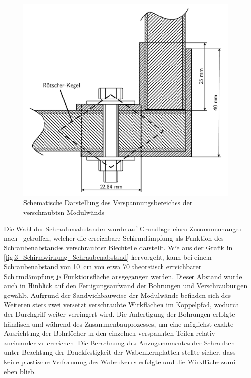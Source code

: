 \begin{figure}[ht]
    \centering
    \includegraphics[page=1, trim=0cm 0cm 0cm 0cm, clip, width = .45\textwidth]{Abbildungen/Kapitel3/Schematik_Verspannungskegel.pdf}
    \caption{Schematische Darstellung des Verspannungsbereiches der verschraubten Modulwände}
    \label{fig:3_Verspannungskegel_L-Profile}
\end{figure}


Die Wahl des Schraubenabstandes wurde auf Grundlage eines Zusammenhanges nach~\cite{Design_of_shielded_enclosures} getroffen, welcher die erreichbare Schirmdämpfung als Funktion des Schraubenabstandes verschraubter Blechteile darstellt. Wie aus der Grafik in \Abb\ref{fig:3_Schirmwirkung_Schraubenabstand} hervorgeht, kann bei einem Schraubenabstand von \SI{10}{\centi\meter} von etwa \SI{70}{\Dezibel} theoretisch erreichbarer Schirmdämpfung je Funktionsfläche ausgegangen werden. Dieser Abstand wurde auch in Hinblick auf den Fertigungsaufwand der Bohrungen und Verschraubungen gewählt. Aufgrund der Sandwichbauweise der Modulwände befinden sich des Weiteren stets zwei versetzt verschraubte Wirkflächen im Koppelpfad, wodurch der Durchgriff weiter verringert wird. Die Anfertigung der Bohrungen erfolgte händisch und während des Zusammenbauprozesses, um eine möglichst exakte Ausrichtung der Bohrlöcher in den einzelnen verspannten Teilen relativ zueinander zu erreichen. Die Berechnung des Anzugsmomentes der Schrauben unter Beachtung der Druckfestigkeit der Wabenkernplatten stellte sicher, dass keine plastische Verformung des Wabenkerns erfolgte und die Wirkfläche somit eben blieb.  


